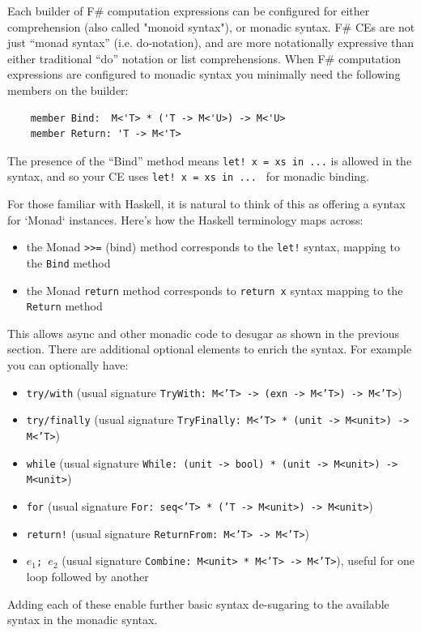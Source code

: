 \documentclass[acmsmall]{acmart}\settopmatter{}
\begin{document}
Each builder of F\# computation expressions can be configured for either comprehension (also called "monoid syntax"), or monadic syntax. 
F\# CEs are not just ``monad syntax'' (i.e. do-notation), and are more notationally expressive than
either traditional ``do'' notation or list comprehensions.
When F\# computation expressions are configured to monadic syntax you minimally need the following members on the builder:
\begin{verbatim}
    member Bind:  M<'T> * ('T -> M<'U>) -> M<'U>
    member Return: 'T -> M<'T>
\end{verbatim}
The presence of the ``Bind'' method means \texttt{let! x = xs in  ...} is allowed in the syntax, and so your CE uses \texttt{let! x = xs in  ... } for monadic binding. 

For those familiar with Haskell, it is natural to think of this as offering a syntax for `Monad`
instances.  Here’s how the Haskell terminology maps across:
\begin{itemize}
\item the Monad \texttt{>>=} (bind) method corresponds to the \texttt{let!} syntax, mapping to the \texttt{Bind} method
\item the Monad \texttt{return} method corresponds to \texttt{return x} syntax mapping to the \texttt{Return} method
\end{itemize}
This allows async and other monadic code to desugar as shown in the previous section. There are additional optional elements to enrich the syntax. For example you can optionally have:
\begin{itemize}
\item \texttt{try/with} (usual signature \texttt{TryWith: M<'T> -> (exn -> M<'T>) -> M<'T>})
\item \texttt{try/finally}  (usual signature \texttt{TryFinally: M<'T> * (unit -> M<unit>) -> M<'T>})
\item \texttt{while} (usual signature \texttt{While: (unit -> bool) * (unit -> M<unit>) -> M<unit>})
\item \texttt{for} (usual signature \texttt{For: seq<'T> * ('T -> M<unit>) -> M<unit>})
\item \texttt{return!} (usual signature \texttt{ReturnFrom: M<'T> -> M<'T>})
\item \texttt{$e_1$; $e_2$} (usual signature \texttt{Combine: M<unit> * M<'T> -> M<'T>}), useful for one loop followed by another 
\end{itemize}
Adding each of these enable further basic syntax de-sugaring to the available syntax in the monadic syntax.
\end{document}
